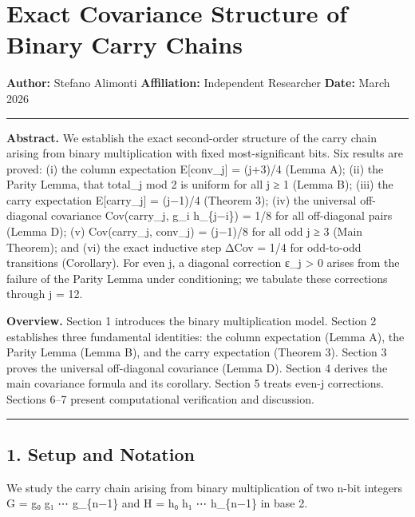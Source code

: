 \documentclass[
  11pt,
]{article}
\author{Stefano Alimonti --- stefalimonti@gmail.com}
\date{March 2026}
\begin{document}
{
\hypersetup{linkcolor=black}
\setcounter{tocdepth}{2}
\tableofcontents
}
\section{Exact Covariance Structure of Binary Carry
Chains}\label{exact-covariance-structure-of-binary-carry-chains}

\textbf{Author:} Stefano Alimonti \textbf{Affiliation:} Independent Researcher
\textbf{Date:} March 2026

\begin{center}\rule{0.5\linewidth}{0.5pt}\end{center}

\textbf{Abstract.} We establish the exact second-order structure of the carry
chain arising from binary multiplication with fixed most-significant bits. Six
results are proved: (i) the column expectation E{[}conv\_j{]} = (j+3)/4 (Lemma
A); (ii) the Parity Lemma, that total\_j mod 2 is uniform for all j ≥ 1 (Lemma
B); (iii) the carry expectation E{[}carry\_j{]} = (j−1)/4 (Theorem 3); (iv) the
universal off-diagonal covariance Cov(carry\_j, g\_i h\_\{j−i\}) = 1/8 for all
off-diagonal pairs (Lemma D); (v) Cov(carry\_j, conv\_j) = (j−1)/8 for all odd j
≥ 3 (Main Theorem); and (vi) the exact inductive step ΔCov = 1/4 for odd-to-odd
transitions (Corollary). For even j, a diagonal correction ε\_j \textgreater{} 0
arises from the failure of the Parity Lemma under conditioning; we tabulate
these corrections through j = 12.

\textbf{Overview.} Section 1 introduces the binary multiplication model. Section
2 establishes three fundamental identities: the column expectation (Lemma A),
the Parity Lemma (Lemma B), and the carry expectation (Theorem 3). Section 3
proves the universal off-diagonal covariance (Lemma D). Section 4 derives the
main covariance formula and its corollary. Section 5 treats even-j corrections.
Sections 6--7 present computational verification and discussion.

\begin{center}\rule{0.5\linewidth}{0.5pt}\end{center}

\newpage

\subsection{1. Setup and Notation}\label{setup-and-notation}

We study the carry chain arising from binary multiplication of two n-bit
integers G = g₀ g₁ ⋯ g\_\{n−1\} and H = h₀ h₁ ⋯ h\_\{n−1\} in base 2.
\end{document}
